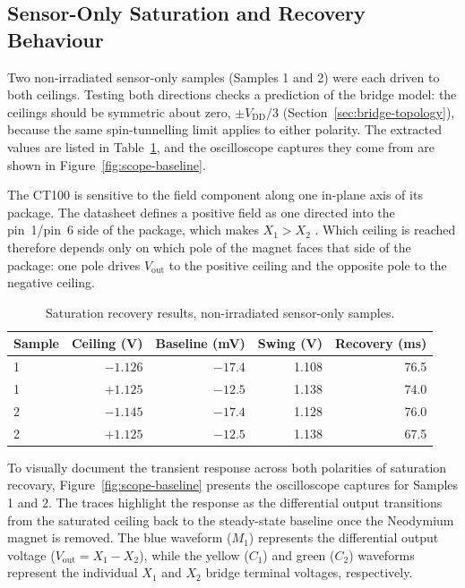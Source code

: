 \documentclass[12pt,a4paper]{article}
\begin{document}
\subsection{Sensor-Only Saturation and Recovery Behaviour}
\label{sec:standalone-sat-recovery}

Two non-irradiated sensor-only samples (Samples 1 and 2) were each driven to both ceilings. Testing both directions checks a prediction of the bridge model: the ceilings should be symmetric about zero, $\pm V_{\text{DD}}/3$ (Section~\ref{sec:bridge-topology}), because the same spin-tunnelling limit applies to either polarity. The extracted values are listed in Table~\ref{tab:sat-nonirr-sensoronly}, and the oscilloscope captures they come from are shown in Figure~\ref{fig:scope-baseline}.

The CT100 is sensitive to the field component along one in-plane axis of its package. The datasheet defines a positive field as one directed into the pin~1/pin~6 side of the package, which makes $X_1 > X_2$ \cite{ct100_datasheet}. Which ceiling is reached therefore depends only on which pole of the magnet faces that side of the package: one pole drives $V_{\text{out}}$ to the positive ceiling and the opposite pole to the negative ceiling.


\begin{table}[H]
\centering
\caption{Saturation recovery results, non-irradiated sensor-only samples.}
\label{tab:sat-nonirr-sensoronly}
\begin{tabular}{@{}lrrrr@{}}
\toprule
Sample & Ceiling (V) & Baseline (mV) & Swing (V) & Recovery (ms) \\
\midrule
1 & $-1.126$ & $-17.4$ & 1.108 & 76.5 \\
1 & $+1.125$ & $-12.5$ & 1.138 & 74.0 \\
2 & $-1.145$ & $-17.4$ & 1.128 & 76.0 \\
2 & $+1.125$ & $-12.5$ & 1.138 & 67.5 \\
\bottomrule
\end{tabular}
\end{table}


To visually document the transient response across both polarities of saturation recovary, Figure~\ref{fig:scope-baseline} presents the oscilloscope captures for Samples 1 and 2. The traces highlight the response as the differential output transitions from the saturated ceiling back to the steady-state baseline once the Neodymium magnet is removed.  The blue waveform ($M_1$) represents the differential output voltage ($V_{\text{out}} = X_1 - X_2$), while the yellow ($C_1$) and green ($C_2$) waveforms represent the individual $X_1$ and $X_2$ bridge terminal voltages, respectively.
\end{document}
